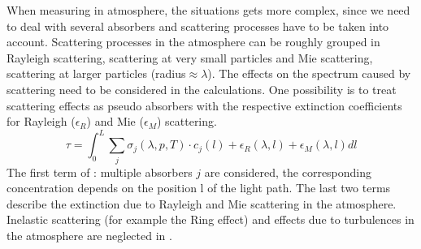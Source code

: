 \documentclass  [
  paper    = a4,
  BCOR     = 10mm,
  twoside,
  fontsize = 12pt,
  fleqn,
  toc      = bibnumbered,
  toc      = listofnumbered,
  numbers  = noendperiod,
  headings = normal,
  listof   = leveldown,
  version  = 3.03
]                                       {scrreprt}
\begin{document}
	When measuring in atmosphere, the situations gets more complex, since we need to deal with several absorbers and scattering processes have to be taken into account. 
	Scattering processes in the atmosphere can be roughly grouped in Rayleigh scattering, scattering at very small particles and Mie scattering, scattering at larger particles (radius$\approx \lambda$). The effects on the spectrum caused by scattering need to be considered in the calculations.  One possibility is to treat scattering effects as pseudo absorbers with the respective extinction coefficients for Rayleigh ($\epsilon_R$) and  Mie ($\epsilon_M$) scattering. 
	\begin{equation}
	\tau = \int^{L}_{0}\sum_{j}\sigma_{j}\left(\lambda,p,T\right)\cdot
	c_{j}\left(l\right)+\epsilon_R\left(\lambda,l\right)+\epsilon_{M}\left(\lambda,l\right)dl
	\label{eq:lbe}
	\end{equation}
	The first term of : multiple absorbers $j$ are considered, the corresponding concentration depends on the position l of the light path.
	The last two terms describe the extinction due to Rayleigh and Mie scattering in the atmosphere.\\
	Inelastic scattering (for example the Ring effect) and effects due to turbulences in the atmosphere are neglected in . 
\end{document}
